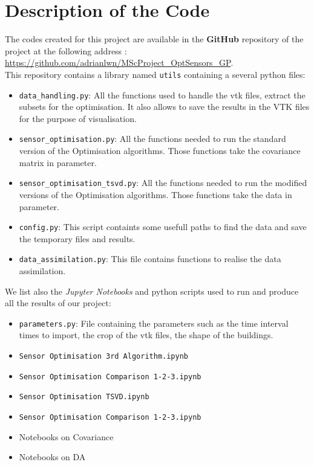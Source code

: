 \chapter{Description of the Code} \label{appendix:code}

The codes created for this project are available in the \textbf{GitHub} repository of the project at the following address : \url{https://github.com/adrianlwn/MScProject\_OptSensors\_GP}. \\

This repository contains a library named \texttt{utils} containing a several python files: 

\begin{itemize}
	\item \texttt{data\_handling.py}: All the functions used to handle the vtk files, extract the subsets for the optimisation. It also allows to save the results in the VTK files for the purpose of visualisation. 
	\item \texttt{sensor\_optimisation.py}: All the functions needed to run the standard version of the Optimisation algorithms. Those functions take the covariance matrix in parameter.  
	\item \texttt{sensor\_optimisation\_tsvd.py}:  All the functions needed to run the modified versions of the Optimisation algorithms. Those functions take the data in parameter. 
	\item \texttt{config.py}: This script containts some usefull paths to find the data and save the temporary files and results. 
	\item \texttt{data\_assimilation.py}: This file contains functions to realise the data assimilation. 
\end{itemize}


We list also the \textit{Jupyter Notebooks} and python scripts used  to run and produce all the results of our project:
\begin{itemize}
	\item \texttt{parameters.py}: File containing the parameters such as the time interval times to import, the crop of the vtk files, the shape of the buildings. 
	\item \texttt{Sensor Optimisation 3rd Algorithm.ipynb}
	\item \texttt{Sensor Optimisation Comparison 1-2-3.ipynb}
	\item \texttt{Sensor Optimisation TSVD.ipynb}
	\item \texttt{Sensor Optimisation Comparison 1-2-3.ipynb}
	\item Notebooks on Covariance 
	\item Notebooks on DA
\end{itemize}


